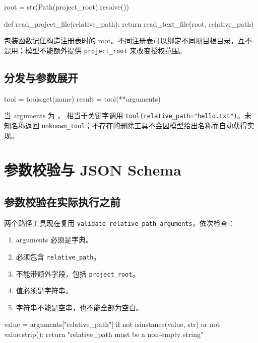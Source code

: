 \begin{Code}
root = str(Path(project_root).resolve())

def read_project_file(relative_path):
    return read_text_file(root, relative_path)
\end{Code}

包装函数记住构造注册表时的 root。不同注册表可以绑定不同项目根目录，互不混用；模型不能额外提供 \nolinkurl{project_root} 来改变授权范围。

\subsection{分发与参数展开}

\begin{Code}
tool = tools.get(name)
result = tool(**arguments)
\end{Code}

当 arguments 为 ， 相当于关键字调用 \nolinkurl{tool(relative_path="hello.txt")}。未知名称返回 \nolinkurl{unknown_tool}；不存在的删除工具不会因模型给出名称而自动获得实现。

\section{参数校验与 JSON Schema}

\subsection{参数校验在实际执行之前}

两个路径工具现在复用 \nolinkurl{validate_relative_path_arguments}，依次检查：

\begin{enumerate}
\item arguments 必须是字典。
\item 必须包含 \nolinkurl{relative_path}。
\item 不能带额外字段，包括 \nolinkurl{project_root}。
\item 值必须是字符串。
\item 字符串不能是空串，也不能全部为空白。
\end{enumerate}

\begin{Code}
value = arguments["relative_path"]
if not isinstance(value, str) or not value.strip():
    return "relative_path must be a non-empty string"
\end{Code}

